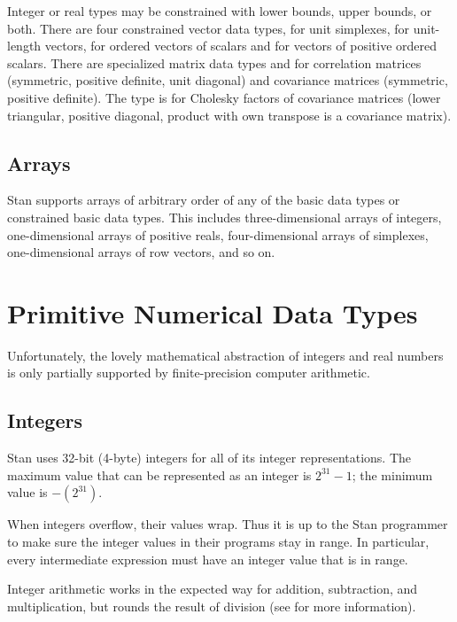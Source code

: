 Integer or real types may be constrained with lower bounds, upper
bounds, or both.  There are four constrained vector data types,
 for unit simplexes,  for unit-length
vectors,  for ordered vectors of scalars and
 for vectors of positive ordered scalars.
There are specialized matrix data types  and
 for correlation matrices (symmetric, positive
definite, unit diagonal) and covariance matrices (symmetric, positive
definite).  The type  is for Cholesky
factors of covariance matrices (lower triangular, positive diagonal,
product with own transpose is a covariance matrix).

\subsection{Arrays}

Stan supports arrays of arbitrary order of any of the basic data
types or constrained basic data types.  This includes
three-dimensional arrays of integers, one-dimensional arrays of
positive reals, four-dimensional arrays of simplexes, one-dimensional
arrays of row vectors, and so on.



\section{Primitive Numerical Data Types}\label{numerical-data-types.section}

Unfortunately, the lovely mathematical abstraction of integers and
real numbers is only partially supported by finite-precision computer
arithmetic.  

\subsection{Integers}

Stan uses 32-bit (4-byte) integers for all of its integer
representations.  The maximum value that can be represented
as an integer is $2^{31}-1$; the minimum value is $-(2^{31})$.

When integers overflow, their values wrap.  Thus it is up to the Stan
programmer to make sure the integer values in their programs stay in
range.  In particular, every intermediate expression must have an
integer value that is in range.

Integer arithmetic works in the expected way for addition,
subtraction, and multiplication, but rounds the result of division
(see  for more information).

